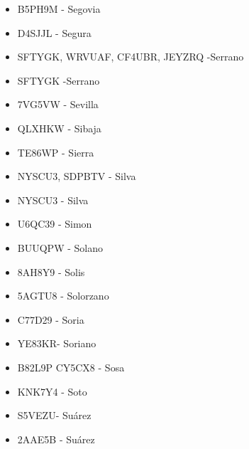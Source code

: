 \begin{itemize}[leftmargin=*,nosep]
\item B5PH9M - Segovia
\item D4SJJL - Segura
\item SFTYGK, WRVUAF, CF4UBR, JEYZRQ -Serrano
\item SFTYGK -Serrano
\item 7VG5VW - Sevilla
\item QLXHKW - Sibaja
\item TE86WP  -  Sierra
\item NYSCU3, SDPBTV - Silva
\item NYSCU3 - Silva
\item U6QC39 -  Simon
\item BUUQPW - Solano
\item 8AH8Y9 - Solis
\item 5AGTU8 - Solorzano
\item C77D29 - Soria
\item YE83KR- Soriano
\item B82L9P CY5CX8 - Sosa
\item KNK7Y4 - Soto
\item S5VEZU- Suárez
\item 2AAE5B - Suárez
\end{itemize}


